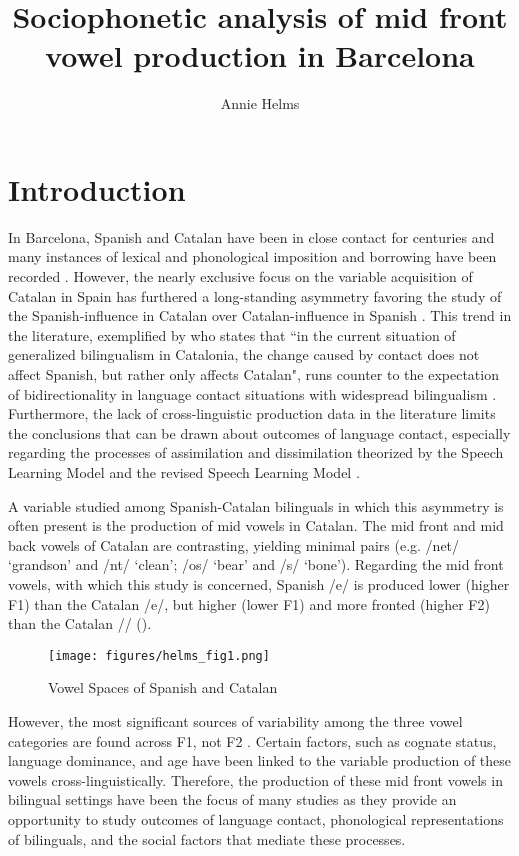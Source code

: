 \documentclass[output=paper,colorlinks,citecolor=brown,draftmode]{langscibook}
\author{Annie Helms\orcid{https://orcid.org/0000-0001-9960-3351}\affiliation{University of California, Berkeley}}
\title{Sociophonetic analysis of mid front vowel production in Barcelona}
\begin{document}
\maketitle

\section{Introduction}

In Barcelona, Spanish and Catalan have been in close contact for centuries and many instances of lexical and phonological imposition and borrowing have been recorded \citep{sole2003language,sole2006llengues,arnal2011linguistic}. However, the nearly exclusive focus on the variable acquisition of Catalan in Spain has furthered a long-standing asymmetry favoring the study of the Spanish-influence in Catalan over Catalan-influence in Spanish \citep[18]{sole2003language}. This trend in the literature, exemplified by \citet[][22]{arnal2011linguistic} who states that ``in the current situation of generalized bilingualism in Catalonia, the change caused by contact does not affect Spanish, but rather only affects Catalan", runs counter to the expectation of bidirectionality in language contact situations with widespread bilingualism \citep{thomason1988contact,davidson2020asymmetry}. Furthermore, the lack of cross-linguistic production data in the literature limits the conclusions that can be drawn about outcomes of language contact, especially regarding the processes of assimilation and dissimilation theorized by the Speech Learning Model \citep[SLM;][]{flege1995second} and the revised Speech Learning Model \citep[SLM-r;][]{flege2021revised}.

A variable studied among Spanish-Catalan bilinguals in which this asymmetry is often present is the production of mid vowels in Catalan. The mid front  and mid back vowels of Catalan are contrasting, yielding minimal pairs (e.g. /net/ `grandson' and /n{\textepsilon}t/ `clean’; /os/ `bear' and /{\textopeno}s/ `bone'). Regarding the mid front vowels, with which this study is concerned, Spanish /e/ is produced lower (higher F1) than the Catalan /e/, but higher (lower F1) and more fronted (higher F2) than the Catalan /\textepsilon/ ().
    \begin{figure}
        \texttt{[image: figures/helms\_fig1.png]}
        \caption{Vowel Spaces of Spanish \citep[][237]{ladefoged2015course} and Catalan \citep[][62]{carbonell1999catalan}}
        \label{fig:vowel_chart}
    \end{figure}
However, the most significant sources of variability among the three vowel categories are found across F1, not F2 \citep{bosch2011variability,cortes2019weighing,recasens2006dispersion,simonet2011production}. Certain factors, such as cognate status, language dominance, and age have been linked to the variable production of these vowels cross-linguistically. Therefore, the production of these mid front vowels in bilingual settings have been the focus of many studies as they provide an opportunity to study outcomes of language contact, phonological representations of bilinguals, and the social factors that mediate these processes.
\end{document}
